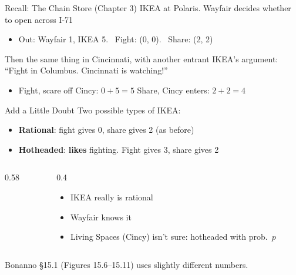 \begin{frame}{Recall: The Chain Store (Chapter 3)}
IKEA at Polaris. Wayfair decides whether to open across I-71
\begin{itemize}
    \item Out: Wayfair 1, IKEA 5. \ Fight: (0, 0). \ Share: (2, 2)
\end{itemize}
\bsk
Then the same thing in Cincinnati, with another entrant
\bsk
IKEA's argument: ``Fight in Columbus. Cincinnati is watching!''
\begin{itemize}
    \item Fight, scare off Cincy: $0+5=5$ \quad Share, Cincy enters: $2+2=4$
\end{itemize}
\bsk
{}
\bsk
{}
\vspace{-0.3in}
\end{frame}

\begin{frame}{Add a Little Doubt}
Two possible types of IKEA:
\begin{itemize}
    \item \textbf{Rational}: fight gives 0, share gives 2 (as before)
    \item \textbf{Hotheaded}: \textbf{likes} fighting. Fight gives 3, share gives 2
\end{itemize}
\bsk
\begin{columns}[c]
\begin{column}{0.58\textwidth}
\centering
\chainks
\end{column}
\begin{column}{0.4\textwidth}
\begin{itemize}
    \item IKEA really is rational
    \item Wayfair knows it
    \item Living Spaces (Cincy) isn't sure: hotheaded with prob.\ $p$
\end{itemize}
\end{column}
\end{columns}
\vfill
{\footnotesize Bonanno \S15.1 (Figures 15.6--15.11) uses slightly different numbers.}
\vspace{-0.2in}
\end{frame}

